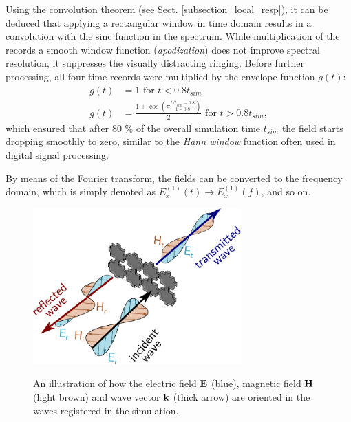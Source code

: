 Using the convolution theorem (see Sect. \ref{subsection_local_resp}), it can be deduced that applying a rectangular window in time domain results in a convolution with the sinc function in the spectrum. While multiplication of the records a  smooth window function (\textit{apodization}) does not improve spectral resolution, it suppresses the visually distracting ringing. Before further processing, all four time records were multiplied by the envelope function $g(t)$:
\begin{equation} 
\begin{split}
	g(t) 	& = 1 \text{ for } t < 0.8 t_{sim} \\
	g(t)    & = \frac{1 + \cos\left(\pi \frac{t/t_{sim}-0.8}{1-0.8}\right)}{2}  \text{ for } t > 0.8 t_{sim},
\end{split}
\label{eq_envelope}\end{equation}
which ensured that after 80 \% of the overall simulation time $t_{sim}$ the field starts dropping smoothly to zero, similar to the \textit{Hann window} function often used in digital signal processing. %

By means of the Fourier transform, the fields can be converted to the frequency domain, which is simply denoted as $E_{x}^{(1)}(t) \rightarrow E_{x}^{(1)}(f)$, and so on. 
\begin{figure}[ht] \caption{An illustration of how the electric field $\mathbf{E}$ (blue), magnetic field $\mathbf{H}$ (light brown) and wave vector ${\mathbf{k}}$ (thick arrow) are oriented in the waves registered in the simulation.}  \centering \includegraphics[width=8cm]{img/sim_separating_wave.pdf} \label{fg_separating_wave}\end{figure}

